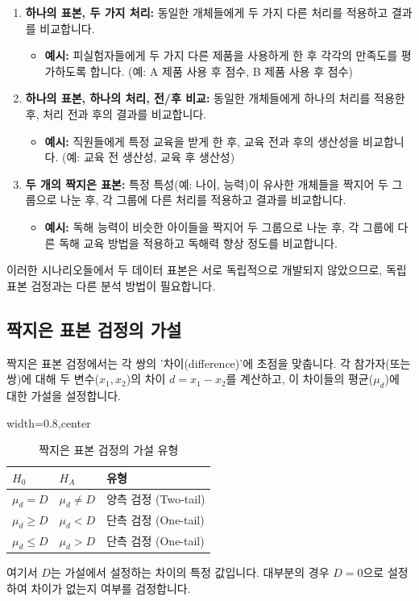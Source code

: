 \documentclass[11pt,a4paper]{article}
\theoremstyle{definition}
\begin{document}
\begin{examplebox}[title=짝지은 표본 실험의 세 가지 시나리오]
\begin{enumerate}
    \item \textbf{하나의 표본, 두 가지 처리:} 동일한 개체들에게 두 가지 다른 처리를 적용하고 결과를 비교합니다.
    \begin{itemize}
        \item \textbf{예시:} 피실험자들에게 두 가지 다른 제품을 사용하게 한 후 각각의 만족도를 평가하도록 합니다. (예: A 제품 사용 후 점수, B 제품 사용 후 점수)
    \end{itemize}
    \item \textbf{하나의 표본, 하나의 처리, 전/후 비교:} 동일한 개체들에게 하나의 처리를 적용한 후, 처리 전과 후의 결과를 비교합니다.
    \begin{itemize}
        \item \textbf{예시:} 직원들에게 특정 교육을 받게 한 후, 교육 전과 후의 생산성을 비교합니다. (예: 교육 전 생산성, 교육 후 생산성)
    \end{itemize}
    \item \textbf{두 개의 짝지은 표본:} 특정 특성(예: 나이, 능력)이 유사한 개체들을 짝지어 두 그룹으로 나눈 후, 각 그룹에 다른 처리를 적용하고 결과를 비교합니다.
    \begin{itemize}
        \item \textbf{예시:} 독해 능력이 비슷한 아이들을 짝지어 두 그룹으로 나눈 후, 각 그룹에 다른 독해 교육 방법을 적용하고 독해력 향상 정도를 비교합니다.
    \end{itemize}
\end{enumerate}
이러한 시나리오들에서 두 데이터 표본은 서로 독립적으로 개발되지 않았으므로, 독립 표본 검정과는 다른 분석 방법이 필요합니다.
\end{examplebox}

\subsection{짝지은 표본 검정의 가설}
짝지은 표본 검정에서는 각 쌍의 '차이(difference)'에 초점을 맞춥니다. 각 참가자(또는 쌍)에 대해 두 변수($x_1, x_2$)의 차이 $d = x_1 - x_2$를 계산하고, 이 차이들의 평균($\mu_d$)에 대한 가설을 설정합니다.

\begin{table}[h!]
\caption{짝지은 표본 검정의 가설 유형}
\label{tab:paired_hypotheses}
\centering
\begin{adjustbox}{width=0.8\textwidth,center}
\begin{tabular}{lll}
\toprule
\textbf{$H_0$} & \textbf{$H_A$} & \textbf{유형} \\
\midrule
$\mu_d = D$ & $\mu_d \ne D$ & 양측 검정 (Two-tail) \\
$\mu_d \ge D$ & $\mu_d < D$ & 단측 검정 (One-tail) \\
$\mu_d \le D$ & $\mu_d > D$ & 단측 검정 (One-tail) \\
\bottomrule
\end{tabular}
\end{adjustbox}
\end{table}
여기서 $D$는 가설에서 설정하는 차이의 특정 값입니다. 대부분의 경우 $D=0$으로 설정하여 차이가 없는지 여부를 검정합니다.
\end{document}
